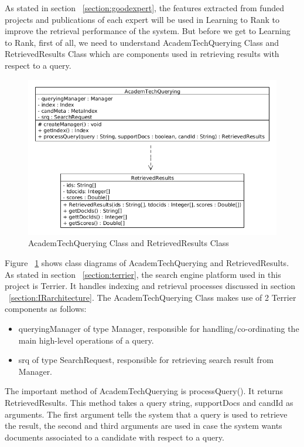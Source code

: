 As stated in section ~\ref{section:goodexpert}, the features extracted from funded projects and publications of each expert will be used in Learning to Rank
to improve the retrieval performance of the system. But before we get to Learning to Rank, first of all, we need to understand
AcademTechQuerying Class and RetrievedResults Class which are components used in retrieving results with respect to a query. 
\begin{figure}
\centering
\includegraphics[scale=0.4]{./figures/AcademTechQuerying.png}
\caption{AcademTechQuerying Class and RetrievedResults Class} \label{fig:AcademTechQuerying} 
\end{figure}

Figure ~\ref{fig:AcademTechQuerying} shows class diagrams of AcademTechQuerying and RetrievedResults. As stated in section ~\ref{section:terrier},
the search engine platform used in this project is Terrier. It handles indexing and retrieval processes discussed in section ~\ref{section:IRarchitecture}.
The AcademTechQuerying Class makes use of 2 Terrier components as follows:  
\begin{itemize}
 \item queryingManager of type Manager, responsible for handling/co-ordinating the main high-level operations of a query.
 \item srq of type SearchRequest, responsible for retrieving search result from Manager.
\end{itemize}
The important method of AcademTechQuerying is processQuery(). It returns RetrievedResults. This method takes a query string, supportDocs and candId as arguments. The first argument tells
the system that a query is used to retrieve the result, the second and third arguments are used in case the system wants documents associated to a candidate 
with respect to a query.

